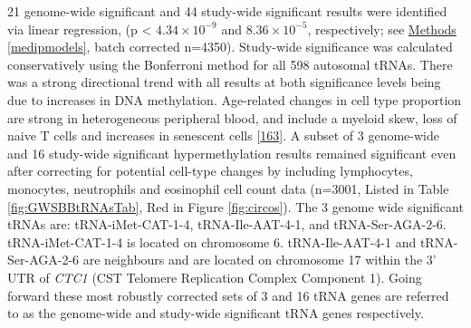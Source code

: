 \documentclass[
]{book}
\begin{document}
21 genome-wide significant and 44 study-wide significant results were identified via linear regression, (p \textless{} \(4.34\times10^{-9}\) and \(8.36\times10^{-5}\), respectively; see \protect\hyperlink{medipmodels}{Methods} \ref{medipmodels}, batch corrected n=4350).
Study-wide significance was calculated conservatively using the Bonferroni method for all 598 autosomal tRNAs.
There was a strong directional trend with all results at both significance levels being due to increases in DNA methylation.
Age-related changes in cell type proportion are strong in heterogeneous peripheral blood, and include a myeloid skew, loss of naive T cells and increases in senescent cells {[}\protect\hyperlink{ref-Geiger2013}{163}{]}.
A subset of 3 genome-wide and 16 study-wide significant hypermethylation results remained significant even after correcting for potential cell-type changes by including lymphocytes, monocytes, neutrophils and eosinophil cell count data (n=3001, Listed in Table \ref{fig:GWSBBtRNAsTab}, Red in Figure \ref{fig:circos}).
The 3 genome wide significant tRNAs are: tRNA-iMet-CAT-1-4, tRNA-Ile-AAT-4-1, and tRNA-Ser-AGA-2-6.
tRNA-iMet-CAT-1-4 is located on chromosome 6.
tRNA-Ile-AAT-4-1 and tRNA-Ser-AGA-2-6 are neighbours and are located on chromosome 17 within the 3' UTR of \emph{CTC1} (CST Telomere Replication Complex Component 1).
Going forward these most robustly corrected sets of 3 and 16 tRNA genes are referred to as the genome-wide and study-wide significant tRNA genes respectively.
\end{document}

